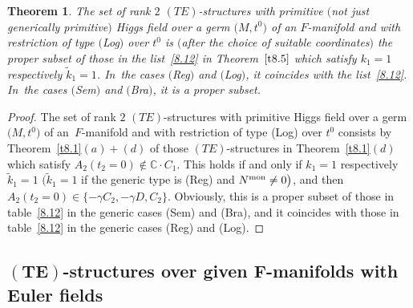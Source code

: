 \documentclass[10pt,a4paper]{amsart}
\numberwithin{equation}{section}
\numberwithin{figure}{section}
\newcommand{\C}{{\mathbb C}}
\newcommand{\www}{\widetilde}
\newtheorem{Theorem}{Theorem}[section]
\begin{document}
\begin{Theorem}\label{t8.6}
The set of rank $2$ $(TE)$-structures
with primitive $($not just generically primitive$)$
Higgs field over a germ $\big(M,t^0\big)$
of an $F$-manifold and with restriction of type $($Log$)$ over $t^0$
is $($after the choice of suitable coordinates$)$
the proper subset of those in the list~\eqref{8.12}
in Theorem~$\ref{t8.5}$ which satisfy $k_1=1$
respectively $\www k_1=1$. In~the cases $($Reg$)$ and $($Log$)$, it coincides with
the list~\eqref{8.12}. In~the cases $($Sem$)$ and $($Bra$)$,
it is a proper subset.
\end{Theorem}

\begin{proof} The set of rank $2$ $(TE)$-structures
with primitive Higgs field over a germ $\big(M,t^0\big)$
of an~$F$-manifold and with restriction of type (Log) over $t^0$
consists by Theorem~\ref{t8.1}$(a){+}(d)$ of those
$(TE)$-structures in Theorem~\ref{t8.1}$(d)$
which satisfy $A_2(t_2=0)\notin\C\cdot C_1$.
This holds if and only if
$k_1=1$ respectively $\www k_1=1$
$\big(\www k_1=1$ if the generic type is (Reg) and $N^{\rm mon}\neq 0\big)$,
and then $A_2(t_2=0)\in\{-\gamma C_2,-\gamma D,C_2\}$.
Obviously, this is a proper
subset of those in table~\eqref{8.12} in the generic
cases (Sem) and (Bra), and it coincides with those
in table~\eqref{8.12} in the generic cases
(Reg) and (Log).
\end{proof}

\subsection[$(TE)$-structures over given $F$-manifolds with Euler fields]{$\boldsymbol{(TE)}$-structures over given $\boldsymbol{F}$-manifolds with Euler fields}\label{c8.2}
\end{document}
